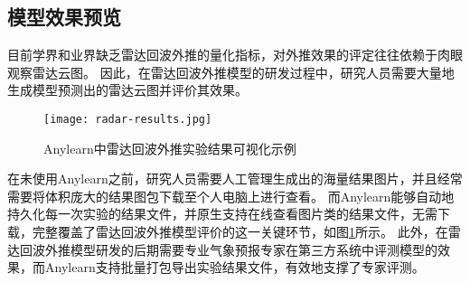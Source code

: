 \subsection{模型效果预览}
目前学界和业界缺乏雷达回波外推的量化指标，对外推效果的评定往往依赖于肉眼观察雷达云图。
因此，在雷达回波外推模型的研发过程中，研究人员需要大量地生成模型预测出的雷达云图并评价其效果。

\begin{figure}
  \centering
  \texttt{[image: radar-results.jpg]}
  \caption{Anylearn中雷达回波外推实验结果可视化示例}
  \label{fig:radarresults}
\end{figure}

在未使用Anylearn之前，研究人员需要人工管理生成出的海量结果图片，并且经常需要将体积庞大的结果图包下载至个人电脑上进行查看。
而Anylearn能够自动地持久化每一次实验的结果文件，并原生支持在线查看图片类的结果文件，无需下载，完整覆盖了雷达回波外推模型评价的这一关键环节，如图\ref{fig:radarresults}所示。
此外，在雷达回波外推模型研发的后期需要专业气象预报专家在第三方系统中评测模型的效果，而Anylearn支持批量打包导出实验结果文件，有效地支撑了专家评测。
